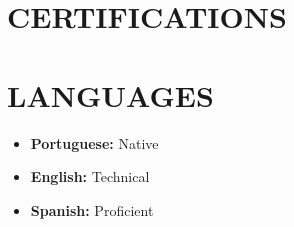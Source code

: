 \documentclass[11pt]{article}
\begin{document}
\section{CERTIFICATIONS}


\section{LANGUAGES}
\begin{itemize}[leftmargin=1em, itemsep=0.05em, topsep=0.1em]
    \item \textbf{Portuguese:} Native
    \item \textbf{English:} Technical
    \item \textbf{Spanish:} Proficient
\end{itemize}
\end{document}
